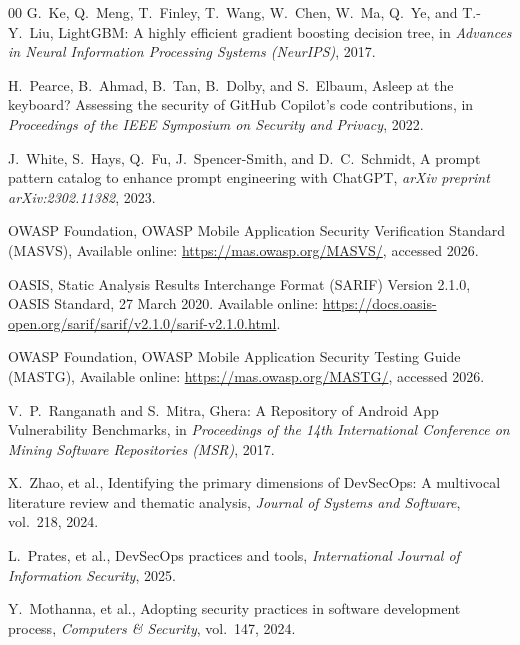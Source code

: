 \documentclass[preprint,12pt, a4paper]{elsarticle}
\begin{document}
\begin{thebibliography}{00}
G.~Ke, Q.~Meng, T.~Finley, T.~Wang, W.~Chen, W.~Ma, Q.~Ye, and T.-Y.~Liu,
LightGBM: A highly efficient gradient boosting decision tree,
in \textit{Advances in Neural Information Processing Systems (NeurIPS)}, 2017.

H.~Pearce, B.~Ahmad, B.~Tan, B.~Dolby, and S.~Elbaum,
Asleep at the keyboard? Assessing the security of GitHub Copilot’s code contributions,
in \textit{Proceedings of the IEEE Symposium on Security and Privacy}, 2022.

J.~White, S.~Hays, Q.~Fu, J.~Spencer-Smith, and D.~C.~Schmidt,
A prompt pattern catalog to enhance prompt engineering with ChatGPT,
\textit{arXiv preprint arXiv:2302.11382}, 2023.

OWASP Foundation,
OWASP Mobile Application Security Verification Standard (MASVS),
Available online: \url{https://mas.owasp.org/MASVS/},
accessed 2026.

OASIS,
Static Analysis Results Interchange Format (SARIF) Version 2.1.0,
OASIS Standard, 27 March 2020.
Available online: \url{https://docs.oasis-open.org/sarif/sarif/v2.1.0/sarif-v2.1.0.html}.

OWASP Foundation,
OWASP Mobile Application Security Testing Guide (MASTG),
Available online: \url{https://mas.owasp.org/MASTG/},
accessed 2026.

V.~P.~Ranganath and S.~Mitra,
Ghera: A Repository of Android App Vulnerability Benchmarks,
in \textit{Proceedings of the 14th International Conference on Mining Software Repositories (MSR)}, 2017.

X.~Zhao, et al.,
Identifying the primary dimensions of DevSecOps: A multivocal literature review and thematic analysis,
\textit{Journal of Systems and Software}, vol.~218, 2024.

L.~Prates, et al.,
DevSecOps practices and tools,
\textit{International Journal of Information Security}, 2025.

Y.~Mothanna, et al.,
Adopting security practices in software development process,
\textit{Computers \& Security}, vol.~147, 2024.

\end{thebibliography}
\end{document}
